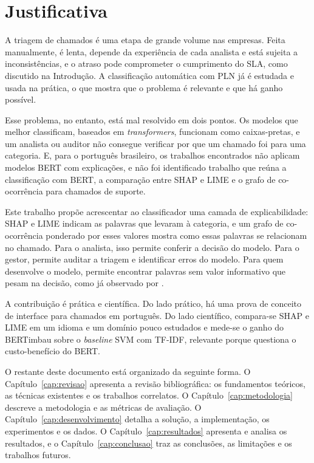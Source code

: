 \documentclass[
    12pt,                %
    openright,           %
    oneside,             %
    a4paper,             %
    english,             %
    brazil               %
]{abntex2}
\begin{document}
\section{Justificativa}
\label{sec:justificativa}

A triagem de chamados é uma etapa de grande volume nas empresas. Feita manualmente, é lenta, depende da experiência de cada analista e está sujeita a inconsistências, e o atraso pode comprometer o cumprimento do SLA, como discutido na Introdução. A classificação automática com PLN já é estudada e usada na prática, o que mostra que o problema é relevante e que há ganho possível.

Esse problema, no entanto, está mal resolvido em dois pontos. Os modelos que melhor classificam, baseados em \textit{transformers}, funcionam como caixas-pretas, e um analista ou auditor não consegue verificar por que um chamado foi para uma categoria. E, para o português brasileiro, os trabalhos encontrados não aplicam modelos BERT com explicações, e não foi identificado trabalho que reúna a classificação com BERT, a comparação entre SHAP e LIME e o grafo de co-ocorrência para chamados de suporte.

Este trabalho propõe acrescentar ao classificador uma camada de explicabilidade: SHAP e LIME indicam as palavras que levaram à categoria, e um grafo de co-ocorrência ponderado por esses valores mostra como essas palavras se relacionam no chamado. Para o analista, isso permite conferir a decisão do modelo. Para o gestor, permite auditar a triagem e identificar erros do modelo. Para quem desenvolve o modelo, permite encontrar palavras sem valor informativo que pesam na decisão, como já observado por .

A contribuição é prática e científica. Do lado prático, há uma prova de conceito de interface para chamados em português. Do lado científico, compara-se SHAP e LIME em um idioma e um domínio pouco estudados e mede-se o ganho do BERTimbau sobre o \textit{baseline} SVM com TF-IDF, relevante porque  questiona o custo-benefício do BERT.

O restante deste documento está organizado da seguinte forma. O Capítulo~\ref{cap:revisao} apresenta a revisão bibliográfica: os fundamentos teóricos, as técnicas existentes e os trabalhos correlatos. O Capítulo~\ref{cap:metodologia} descreve a metodologia e as métricas de avaliação. O Capítulo~\ref{cap:desenvolvimento} detalha a solução, a implementação, os experimentos e os dados. O Capítulo~\ref{cap:resultados} apresenta e analisa os resultados, e o Capítulo~\ref{cap:conclusao} traz as conclusões, as limitações e os trabalhos futuros.
\end{document}
